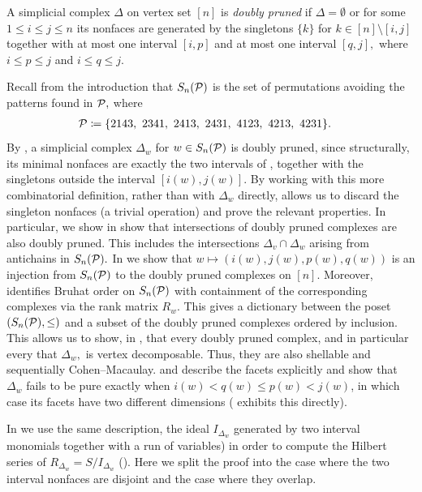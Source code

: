 \begin{definition}
\label{def: doubly pruned simplicial complexes}
A simplicial complex $\Delta$ on vertex set $[n]$ is \emph{doubly pruned} if $\Delta = \emptyset$ or for some $1\leq i\leq j\leq n$ its nonfaces are generated by the singletons $\{k\}$ for $k\in[n]\setminus[i,j]$ together with at most one interval $[i,p]$ and at most one interval $[q,j],$ where $i\leq p\leq j$ and $i\leq q\leq j.$
\end{definition}
Recall from the introduction that $S_n(\mathcal{P})$ is the set of permutations avoiding the patterns found in $\mathcal{P},$ where
\begin{align*}
\mathcal{P} &\coloneqq \{ 2143,\ 2341,\ 2413,\ 2431,\ 4123,\ 4213,\ 4231 \}.
\end{align*}
By , a simplicial complex $\Delta_w$ for $w\in S_n(\mathcal{P})$ is doubly pruned, since structurally, its minimal nonfaces are exactly the two intervals of , together with the singletons outside the interval $[i(w),j(w)].$ By working with this more combinatorial definition, rather than with $\Delta_w$ directly, allows us to discard the singleton nonfaces (a trivial operation) and prove the relevant properties. In particular, we show in  show that intersections of doubly pruned complexes are also doubly pruned. This includes the intersections $\Delta_v\cap\Delta_w$ arising from antichains in $S_n(\mathcal{P}).$ 
In  we show that $w\mapsto(i(w),j(w),p(w),q(w))$ is an injection from $S_n(\mathcal{P})$ to the doubly pruned complexes on $[n].$ 
Moreover,  identifies Bruhat order on $S_n(\mathcal{P})$ with containment of the corresponding complexes via the rank matrix $R_w.$ 
This gives a dictionary between the poset $(S_n(\mathcal{P}),\leq)$ and a subset of the doubly pruned complexes ordered by inclusion. 
This allows us to show, in , that every doubly pruned complex, and in particular every that $\Delta_w,$ is vertex decomposable. Thus, they are also shellable and sequentially Cohen--Macaulay.  and  describe the facets explicitly and show that $\Delta_w$ fails to be pure exactly when
$i(w)<q(w)\leq p(w)<j(w)$, in which case its facets have two different dimensions ( exhibits this directly). 

In  we use the same description, the ideal $I_{\Delta_w}$ generated by two interval monomials together with a run of variables) in order to compute
the Hilbert series of $R_{\Delta_w}=S/I_{\Delta_w}$
(). Here we split the proof into the case where
the two interval nonfaces are disjoint and the case where they overlap.
